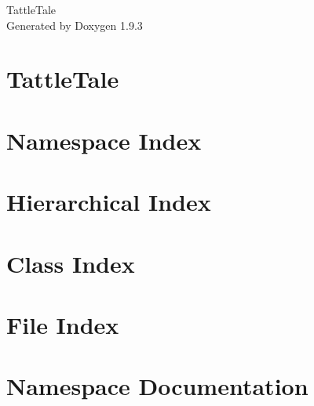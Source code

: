 \documentclass[twoside]{book}
\newcommand{\+}{\discretionary{\mbox{\scriptsize$\hookleftarrow$}}{}{}}
\newcommand{\clearemptydoublepage}{%
    \newpage{\pagestyle{empty}\cleardoublepage}%
  }
\begin{document}
  \raggedbottom
    \hypersetup{pageanchor=false,
                bookmarksnumbered=true,
                pdfencoding=unicode
               }
  \begin{titlepage}
  \vspace*{7cm}
  \begin{center}%
  {\Large Tattle\+Tale}\\
  \vspace*{1cm}
  {\large Generated by Doxygen 1.9.3}\\
  \end{center}
  \end{titlepage}
  \clearemptydoublepage
  \tableofcontents
  \clearemptydoublepage
  \hypersetup{pageanchor=true}
\chapter{Tattle\+Tale}
\label{index}\hypertarget{index}{}
\chapter{Namespace Index}

\chapter{Hierarchical Index}

\chapter{Class Index}

\chapter{File Index}

\chapter{Namespace Documentation}

\end{document}
